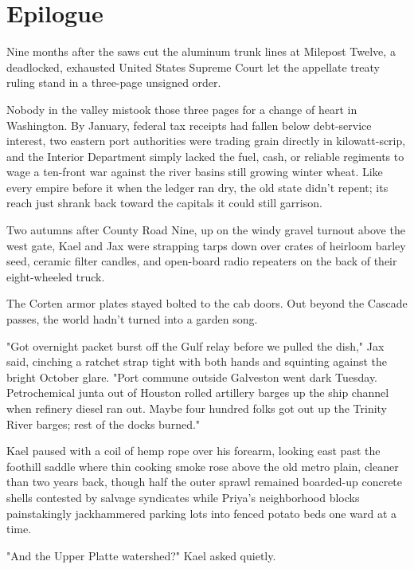 \chapter*{Epilogue}


Nine months after the saws cut the aluminum trunk lines at Milepost Twelve, a deadlocked, exhausted United States Supreme Court let the appellate treaty ruling stand in a three-page unsigned order.

Nobody in the valley mistook those three pages for a change of heart in Washington. By January, federal tax receipts had fallen below debt-service interest, two eastern port authorities were trading grain directly in kilowatt-scrip, and the Interior Department simply lacked the fuel, cash, or reliable regiments to wage a ten-front war against the river basins still growing winter wheat. Like every empire before it when the ledger ran dry, the old state didn't repent; its reach just shrank back toward the capitals it could still garrison.

Two autumns after County Road Nine, up on the windy gravel turnout above the west gate, Kael and Jax were strapping tarps down over crates of heirloom barley seed, ceramic filter candles, and open-board radio repeaters on the back of their eight-wheeled truck.

The Corten armor plates stayed bolted to the cab doors. Out beyond the Cascade passes, the world hadn't turned into a garden song.

"Got overnight packet burst off the Gulf relay before we pulled the dish," Jax said, cinching a ratchet strap tight with both hands and squinting against the bright October glare. "Port commune outside Galveston went dark Tuesday. Petrochemical junta out of Houston rolled artillery barges up the ship channel when refinery diesel ran out. Maybe four hundred folks got out up the Trinity River barges; rest of the docks burned."

Kael paused with a coil of hemp rope over his forearm, looking east past the foothill saddle where thin cooking smoke rose above the old metro plain, cleaner than two years back, though half the outer sprawl remained boarded-up concrete shells contested by salvage syndicates while Priya's neighborhood blocks painstakingly jackhammered parking lots into fenced potato beds one ward at a time.

"And the Upper Platte watershed?" Kael asked quietly.

